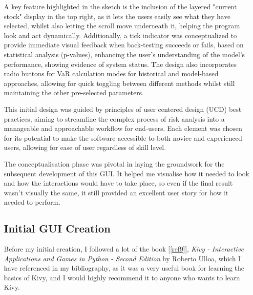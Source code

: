 \documentclass{article}
\begin{document}
A key feature highlighted in the sketch is the inclusion of the layered "current stock" display in the top right, as it lets the users easily see what they have selected, whilst also letting the scroll move underneath it, helping the program look and act dynamically. Additionally, a tick indicator was conceptualized to provide immediate visual feedback when back-testing succeeds or fails, based on statistical analysis (p-values), enhancing the user's understanding of the model's performance, showing evidence of system status. The design also incorporates radio buttons for VaR calculation modes for historical and model-based approaches, allowing for quick toggling between different methods whilst still maintaining the other pre-selected parameters.\\\vspace{0.3cm}

This initial design was guided by principles of user centered design (UCD) best practices, aiming to streamline the complex process of risk analysis into a manageable and approachable workflow for end-users. Each element was chosen for its potential to make the software accessible to both novice and experienced users, allowing for ease of user regardless of skill level.\\\vspace{0.3cm}

The conceptualisation phase was pivotal in laying the groundwork for the subsequent development of this GUI. It helped me visualise how it needed to look and how the interactions would have to take place, so even if the final result wasn't visually the same, it still provided an excellent user story for how it needed to perform.

\subsection{Initial GUI Creation}
Before my initial creation, I followed a lot of the book [\ref{ref9}], \textit{Kivy - Interactive Applications and Games in Python - Second Edition} by Roberto Ulloa, which I have referenced in my bibliography, as it was a very useful book for learning the basics of Kivy, and I would highly recommend it to anyone who wants to learn Kivy.\\\vspace{0.3cm}



\end{document}

